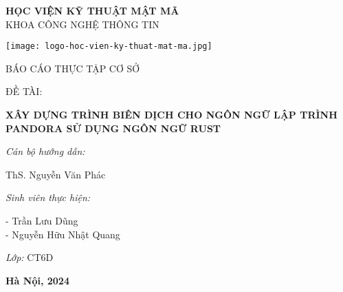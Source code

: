 
\fontsize{16}{19.2pt}\selectfont 
\vspace{-1cm}
\begin{center}
    \textbf{ HỌC VIỆN KỸ THUẬT MẬT MÃ}\\
    KHOA CÔNG NGHỆ THÔNG TIN
\end{center}



\vspace{-0.5cm}

\begin{center}
    \texttt{[image: logo-hoc-vien-ky-thuat-mat-ma.jpg]}
\end{center}


\vspace{-1cm}
\begin{center}
    BÁO CÁO THỰC TẬP CƠ SỞ \\
\end{center}

\vspace{-0.5cm}
ĐỀ TÀI:
\fontsize{18}{21.6pt}\selectfont 
\begin{center}
    \textbf{ XÂY DỰNG TRÌNH BIÊN DỊCH CHO NGÔN NGỮ LẬP TRÌNH PANDORA SỬ DỤNG NGÔN NGỮ RUST\\}
\end{center}

\vspace{1cm}
{\bf{
    \hspace{\parindent}\textit{Cán bộ hướng dẫn:}

     ThS. Nguyễn Văn Phác

    \hspace{\parindent}\textit{Sinh viên thực hiện:}

     - Trần Lưu Dũng\\
     - Nguyễn Hữu Nhật Quang
    
    \hspace{\parindent}\textit{Lớp: } CT6D
    
}}

\vfill 
\begin{center}
   \bf{Hà Nội, 2024}
\end{center}
